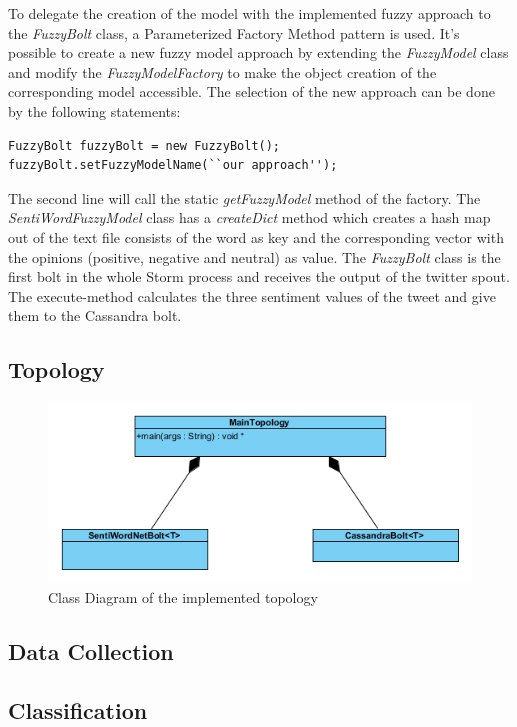 \documentclass[a4paper]{article}
\begin{document}
To delegate the creation of the model with the implemented fuzzy approach to the \textit{FuzzyBolt} class, a Parameterized Factory Method pattern is used. It's possible to create a new fuzzy model approach by extending the \textit{FuzzyModel} class and modify the \textit{FuzzyModelFactory} to make the object creation of the corresponding model accessible. The selection of the new approach can be done by the following statements:
\lstset{language=Java}
\begin{lstlisting}
FuzzyBolt fuzzyBolt = new FuzzyBolt();
fuzzyBolt.setFuzzyModelName(``our approach'');
\end{lstlisting}
The second line will call the static \textit{getFuzzyModel} method of the factory.
The \textit{SentiWordFuzzyModel} class has a \textit{createDict} method which creates a hash map out of the text file consists of the word as key and the corresponding vector with the opinions (positive, negative and neutral) as value.
The \textit{FuzzyBolt} class is the first bolt in the whole Storm process and receives the output of the twitter spout. The execute-method calculates the three sentiment values of the tweet and give them to the Cassandra bolt.

\subsection{Topology}
\begin{figure}[h!]
	\centering
	\includegraphics[scale=2.5]{images/uml_topology.png}
	\caption{Class Diagram of the implemented topology}
	\label{uml_fuzzy}
\end{figure}
\subsection{Data Collection}
\subsection{Classification}
\end{document}
